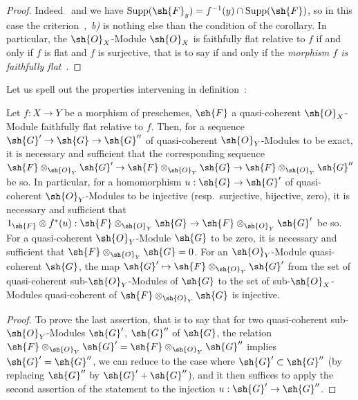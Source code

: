 \begin{proof}
Indeed~ and  we have $\operatorname{Supp}(\sh{F}_y)=f^{-1}(y)\cap\operatorname{Supp}(\sh{F})$, so in this case the criterion~,~\emph{b)} is nothing else than the condition of the corollary.
In particular, the $\sh{O}_X$-Module $\sh{O}_X$ is faithfully flat relative to $f$ if and only if $f$ is flat and $f$ is surjective, that is to say if and only if the \emph{morphism $f$ is faithfully flat}~.
\end{proof}

Let us spell out the properties intervening in definition~:

\begin{proposition}[2.2.7]
\label{IV.2.2.7}
Let $f:X\to Y$ be a morphism of preschemes, $\sh{F}$ a quasi-coherent $\sh{O}_X$-Module faithfully flat relative to $f$.
Then, for a sequence $\sh{G}'\to\sh{G}\to\sh{G}''$ of quasi-coherent $\sh{O}_Y$-Modules to be exact, it is necessary and sufficient that the corresponding sequence $\sh{F}\otimes_{\sh{O}_Y}\sh{G}'\to\sh{F}\otimes_{\sh{O}_Y}\sh{G}\to\sh{F}\otimes_{\sh{O}_Y}\sh{G}''$ be so.
In particular, for a homomorphism $u:\sh{G}\to\sh{G}'$ of quasi-coherent $\sh{O}_Y$-Modules to be injective \textnormal{(}resp.\ surjective, bijective, zero\textnormal{)}, it is necessary and sufficient that $1_{\sh{F}}\otimes f^*(u):\sh{F}\otimes_{\sh{O}_Y}\sh{G}\to\sh{F}\otimes_{\sh{O}_Y}\sh{G}'$ be so.
For a quasi-coherent $\sh{O}_Y$-Module $\sh{G}$ to be zero, it is necessary and sufficient that $\sh{F}\otimes_{\sh{O}_Y}\sh{G}=0$.
For an $\sh{O}_Y$-Module quasi-coherent $\sh{G}$, the map $\sh{G}'\mapsto\sh{F}\otimes_{\sh{O}_Y}\sh{G}'$ from the set of quasi-coherent sub-$\sh{O}_Y$-Modules of $\sh{G}$ to the set of sub-$\sh{O}_X$-Modules quasi-coherent of $\sh{F}\otimes_{\sh{O}_Y}\sh{G}$ is injective.
\end{proposition}

\begin{proof}
To prove the last assertion, that is to say that for two quasi-coherent sub-$\sh{O}_Y$-Modules $\sh{G}'$, $\sh{G}''$ of $\sh{G}$, the relation $\sh{F}\otimes_{\sh{O}_Y}\sh{G}'=\sh{F}\otimes_{\sh{O}_Y}\sh{G}''$ implies $\sh{G}'=\sh{G}''$, we can reduce to the case where $\sh{G}'\subset\sh{G}''$ (by replacing $\sh{G}''$ by $\sh{G}'+\sh{G}''$), and it then suffices to apply the second assertion of the statement to the injection $u:\sh{G}'\to\sh{G}''$.
\end{proof}

